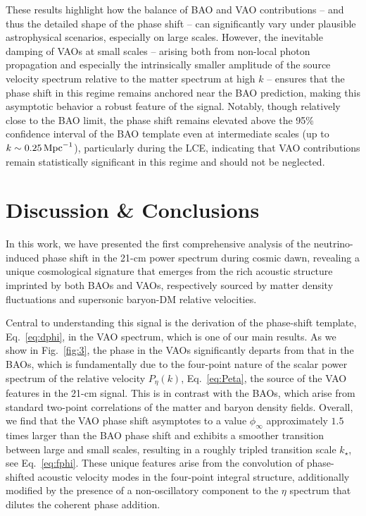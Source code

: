 \documentclass[floats,floatfix,showpacs,amssymb,prd,twocolumn,superscriptaddress,nofootinbib,reprint,preprintnumbers]{revtex4-2}
\begin{document}
These results highlight how the balance of BAO and VAO contributions -- and thus the detailed shape of the phase shift -- can significantly vary under plausible astrophysical scenarios, especially on large scales.  However, the inevitable damping of VAOs at small scales --  arising both from non-local photon propagation and especially the intrinsically smaller amplitude of the source velocity spectrum relative to the matter spectrum at high $k$ -- ensures that the phase shift in this regime remains anchored near the BAO prediction, making this asymptotic behavior a robust feature of the signal. Notably, though relatively close to the BAO limit, the phase shift remains elevated above the 95\% confidence interval of the BAO template even at intermediate scales (up to $k \sim 0.25\,\rm{Mpc}^{-1}$), particularly during the LCE, indicating that VAO contributions remain statistically significant in this regime and should not be neglected.

\section{Discussion \& Conclusions}\label{sec:5}

\noindent In this work, we have presented the first comprehensive analysis of the neutrino-induced phase shift in the 21-cm power spectrum during cosmic dawn, revealing a unique cosmological signature that emerges from the rich acoustic structure imprinted by both BAOs and VAOs, respectively sourced by matter density fluctuations and supersonic baryon-DM relative velocities. 

Central to understanding this signal is the derivation of the phase-shift template, Eq.~\eqref{eq:dphi}, in the VAO spectrum, which 
is one of our main results. As we show in Fig.~\ref{fig:3}, the phase in the VAOs significantly departs from that in the BAOs, which is fundamentally due to the four-point nature of the scalar power spectrum of the relative velocity $P_\eta(k)$, Eq.~\eqref{eq:Peta}, the source of the VAO features in the 21-cm signal. This is in contrast with the BAOs, which arise from standard two-point correlations of the matter and baryon density fields. Overall, we find that the VAO phase shift asymptotes to a value $\phi_\infty$ approximately $1.5$ times larger than the BAO phase shift and exhibits a smoother transition between large and small scales, resulting in a roughly tripled transition scale $k_\star$, see Eq.~\eqref{eq:fphi}. These unique features arise from the convolution of phase-shifted acoustic velocity modes in the four-point integral structure, additionally modified by the presence of a non-oscillatory component to the $\eta$ spectrum that dilutes the coherent phase addition.
\end{document}
